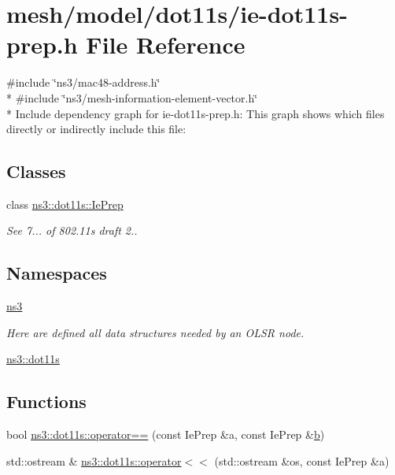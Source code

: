 \hypertarget{ie-dot11s-prep_8h}{}\section{mesh/model/dot11s/ie-\/dot11s-\/prep.h File Reference}
\label{ie-dot11s-prep_8h}
{\ttfamily \#include \char`\"{}ns3/mac48-\/address.\+h\char`\"{}}\\*
{\ttfamily \#include \char`\"{}ns3/mesh-\/information-\/element-\/vector.\+h\char`\"{}}\\*
Include dependency graph for ie-\/dot11s-\/prep.h\+:
This graph shows which files directly or indirectly include this file\+:
\subsection*{Classes}
\begin{DoxyCompactItemize}
\item 
class \hyperlink{classns3_1_1dot11s_1_1IePrep}{ns3\+::dot11s\+::\+Ie\+Prep}
\begin{DoxyCompactList}\small\item\em See 7... of 802.\+11s draft 2.. \end{DoxyCompactList}\end{DoxyCompactItemize}
\subsection*{Namespaces}
\begin{DoxyCompactItemize}
\item 
 \hyperlink{namespacens3}{ns3}
\begin{DoxyCompactList}\small\item\em Here are defined all data structures needed by an O\+L\+SR node. \end{DoxyCompactList}\item 
 \hyperlink{namespacens3_1_1dot11s}{ns3\+::dot11s}
\end{DoxyCompactItemize}
\subsection*{Functions}
\begin{DoxyCompactItemize}
\item 
bool \hyperlink{namespacens3_1_1dot11s_ae66899f8527cbcb352641ad7be578d3c}{ns3\+::dot11s\+::operator==} (const Ie\+Prep \&a, const Ie\+Prep \&\hyperlink{lte__pathloss_8m_a21ad0bd836b90d08f4cf640b4c298e7c}{b})
\item 
std\+::ostream \& \hyperlink{namespacens3_1_1dot11s_aba902fc751de915aef23553575d43c57}{ns3\+::dot11s\+::operator$<$$<$} (std\+::ostream \&os, const Ie\+Prep \&a)
\end{DoxyCompactItemize}
